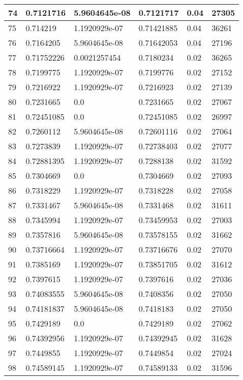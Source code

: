 \begin{longtable}{|l|l|l|l|l|l|}
74 & 0.7121716 & 5.9604645e-08 & 0.7121717 & 0.04 & 27305 \\ \hline 
75 & 0.714219 & 1.1920929e-07 & 0.71421885 & 0.04 & 36261 \\ \hline 
76 & 0.7164205 & 5.9604645e-08 & 0.71642053 & 0.04 & 27196 \\ \hline 
77 & 0.71752226 & 0.0021257454 & 0.7180234 & 0.02 & 36265 \\ \hline 
78 & 0.7199775 & 1.1920929e-07 & 0.7199776 & 0.02 & 27152 \\ \hline 
79 & 0.7216922 & 1.1920929e-07 & 0.7216923 & 0.02 & 27139 \\ \hline 
80 & 0.7231665 & 0.0 & 0.7231665 & 0.02 & 27067 \\ \hline 
81 & 0.72451085 & 0.0 & 0.72451085 & 0.02 & 26997 \\ \hline 
82 & 0.7260112 & 5.9604645e-08 & 0.72601116 & 0.02 & 27064 \\ \hline 
83 & 0.7273839 & 1.1920929e-07 & 0.72738403 & 0.02 & 27077 \\ \hline 
84 & 0.72881395 & 1.1920929e-07 & 0.7288138 & 0.02 & 31592 \\ \hline 
85 & 0.7304669 & 0.0 & 0.7304669 & 0.02 & 27093 \\ \hline 
86 & 0.7318229 & 1.1920929e-07 & 0.7318228 & 0.02 & 27058 \\ \hline 
87 & 0.7331467 & 5.9604645e-08 & 0.7331468 & 0.02 & 31611 \\ \hline 
88 & 0.7345994 & 1.1920929e-07 & 0.73459953 & 0.02 & 27003 \\ \hline 
89 & 0.7357816 & 5.9604645e-08 & 0.73578155 & 0.02 & 31662 \\ \hline 
90 & 0.73716664 & 1.1920929e-07 & 0.73716676 & 0.02 & 27070 \\ \hline 
91 & 0.7385169 & 1.1920929e-07 & 0.73851705 & 0.02 & 31612 \\ \hline 
92 & 0.7397615 & 1.1920929e-07 & 0.7397616 & 0.02 & 27036 \\ \hline 
93 & 0.74083555 & 5.9604645e-08 & 0.7408356 & 0.02 & 27050 \\ \hline 
94 & 0.74181837 & 5.9604645e-08 & 0.7418183 & 0.02 & 27050 \\ \hline 
95 & 0.7429189 & 0.0 & 0.7429189 & 0.02 & 27062 \\ \hline 
96 & 0.74392956 & 1.1920929e-07 & 0.74392945 & 0.02 & 31628 \\ \hline 
97 & 0.7449855 & 1.1920929e-07 & 0.7449854 & 0.02 & 27024 \\ \hline 
98 & 0.74589145 & 1.1920929e-07 & 0.74589133 & 0.02 & 31596 \\ \hline 

\end{longtable}

